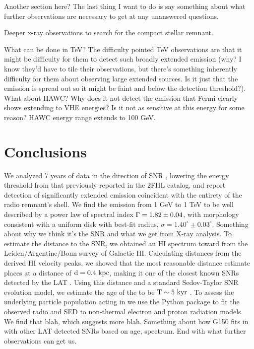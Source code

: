 Another section here? The last thing I want to do is say something about what further observations are necessary to get at any unanswered questions. 

Deeper x-ray observations to search for the compact stellar remnant. 

What can be done in TeV? The difficulty pointed TeV observations are that it might be difficulty for them to detect such broadly extended emission (why? I know they'd have to tile their observations, but there's something inherently difficulty for them about observing large extended sources. Is it just that the emission is spread out so it might be faint and below the detection threshold?). What about HAWC? Why does it not detect the emission that Fermi clearly shows extending to VHE energies? Is it not as sensitive at this energy for some reason? HAWC energy range extends to 100 GeV.


%
%
\section{Conclusions}\label{sec:Conc}
We analyzed 7 years of \FermiLat{} data in the direction of SNR \Gone{}, lowering the energy threshold from that previously reported in the 2FHL catalog, and report detection of significantly extended \gam{} emission coincident with the entirety of the radio remnant's shell. We find the emission from 1 GeV to 1 TeV to be well described by a power law of spectral index ${\Gamma = \rm 1.82 \pm 0.04}$, with  morphology consistent with a uniform disk with best-fit radius, {\rm $\sigma = 1.40^{\circ} \pm 0.03^{\circ}$}. Something about why we think it's the SNR and what we get from X-ray analysis. To estimate the distance to the SNR, we obtained  an HI spectrum toward \Gone{} from the Leiden/Argentine/Bonn survey of Galactic HI. Calculating distances from the derived HI velocity peaks, we showed that the most reasonable distance estimate places \Gone{} at a distance of ${\rm d = 0.4~kpc}$, making it one of the closest known SNRs detected by the LAT . Using this distance and a standard Sedov-Taylor SNR evolution model, we estimate the age of the \Gone{} to be ${\rm T \sim 5~kyr}$ . To assess the underlying particle population acting in \Gone{} we use the \nai{} Python package to fit the observed radio and \gam{} SED to non-thermal electron and proton radiation models. We find that blah, which suggests more blah. Something about how G150  fits in with other LAT detected SNRs based on age, spectrum. End with what  further observations can get us.